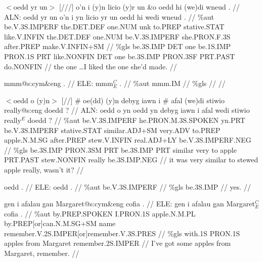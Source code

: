 \documentclass[a4paper,10pt]{article}
\begin{document}
\ex
\begingl[lingstyle=gergl]
\glchat $<$oedd yr un$>$ [///] o'n i (y)n licio (y)r un \&o oedd hi (we)di wneud . //
\glsurface ALN:  oedd yr un o'n i yn licio yr un oedd hi wedi wneud .  //
\glauto \%aut  be{\scriptsize .V.3S.IMPERF} the{\scriptsize .DET.DEF} one{\scriptsize .NUM} unk to{\scriptsize .PREP} stative{\scriptsize .STAT} like{\scriptsize .V.INFIN} the{\scriptsize .DET.DEF} one{\scriptsize .NUM} be{\scriptsize .V.3S.IMPERF} she{\scriptsize .PRON.F.3S} after{\scriptsize .PREP} make{\scriptsize .V.INFIN+SM}   //
\glmanual \%gls  be{\scriptsize .3S.IMP} DET one be{\scriptsize .1S.IMP} PRON{\scriptsize .1S} PRT like{\scriptsize .NONFIN} DET one be{\scriptsize .3S.IMP} PRON{\scriptsize .3SF} PRT{\scriptsize .PAST} do{\scriptsize .NONFIN}   //
\gleng the one \dots I liked the one she'd made. //
\endgl
\xe

\ex
\begingl[lingstyle=gergl]
\glchat mmm@s:cym\&eng . //
\glsurface ELE:  mmm$^{C}_{E}$ .  //
\glauto \%aut  mmm{\scriptsize .IM}   //
\glmanual \%gls     //
\gleng  //
\endgl
\xe

\ex
\begingl[lingstyle=gergl]
\glchat $<$oedd o (y)n$>$ [//] \# oe(dd) (y)n debyg iawn i \# afal (we)di stiwio really@s:eng doedd ? //
\glsurface ALN:  oedd o yn oedd yn debyg iawn i afal wedi stiwio really$^{E}$ doedd ?  //
\glauto \%aut  be{\scriptsize .V.3S.IMPERF} he{\scriptsize .PRON.M.3S.SPOKEN} yn{\scriptsize .PRT} be{\scriptsize .V.3S.IMPERF} stative{\scriptsize .STAT} similar{\scriptsize .ADJ+SM} very{\scriptsize .ADV} to{\scriptsize .PREP} apple{\scriptsize .N.M.SG} after{\scriptsize .PREP} stew{\scriptsize .V.INFIN} real{\scriptsize .ADJ+LY} be{\scriptsize .V.3S.IMPERF.NEG}   //
\glmanual \%gls  be{\scriptsize .3S.IMP} PRON{\scriptsize .3SM} PRT be{\scriptsize .3S.IMP} PRT similar very to apple PRT{\scriptsize .PAST} stew{\scriptsize .NONFIN} really be{\scriptsize .3S.IMP.NEG}   //
\gleng it was very similar to stewed apple really, wasn't it? //
\endgl
\xe

\ex
\begingl[lingstyle=gergl]
\glchat oedd . //
\glsurface ELE:  oedd .  //
\glauto \%aut  be{\scriptsize .V.3S.IMPERF}   //
\glmanual \%gls  be{\scriptsize .3S.IMP}   //
\gleng yes. //
\endgl
\xe

\ex
\begingl[lingstyle=gergl]
\glchat gen i afalau gan Margaret@s:cym\&eng cofia . //
\glsurface ELE:  gen i afalau gan Margaret$^{C}_{E}$ cofia .  //
\glauto \%aut  by{\scriptsize .PREP.SPOKEN} I{\scriptsize .PRON.1S} apple{\scriptsize .N.M.PL} by{\scriptsize .PREP[or]can.N.M.SG+SM} name remember{\scriptsize .V.2S.IMPER[or]remember.V.3S.PRES}   //
\glmanual \%gls  with{\scriptsize .1S} PRON{\scriptsize .1S} apples from Margaret remember{\scriptsize .2S.IMPER}   //
\gleng I've got some apples from Margaret, remember. //
\endgl
\xe
\end{document}
